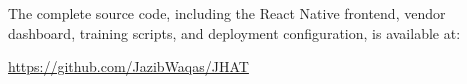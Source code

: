 \bigskip
\noindent The complete source code, including the React Native frontend, vendor
dashboard, training scripts, and deployment configuration, is available at:

\begin{center}
  \url{https://github.com/JazibWaqas/JHAT}
\end{center}

